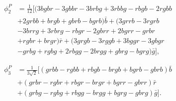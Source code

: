 \documentclass[prd,twocolumn,floatfix,nofootinbib]{revtex4}
\begin{document}
\begin{equation}
    \begin{aligned}
        \phi_{2}^{P} &=\frac{1}{12}\Big[(3bgbr-3gbbr-3brbg+3rbbg-rbgb-2rgbb \nonumber\\
        &+2grbb+brgb+gbrb-bgrb)\bar{b}+(3grrb-3rgrb \nonumber\\
        &-3brrg+3rbrg-rbgr-2gbrr+2bgrr-grbr  \nonumber \\
        &+rgbr+brgr)\bar{r}+(3grgb-3rggb+3bggr-3gbgr\nonumber \\
        &-grbg+rgbg+2rbgg-2brgg+gbrg-bgrg)\bar{g}\Big],    
    \end{aligned}
\end{equation}
    
\begin{equation}
    \begin{aligned}
        \phi_{3}^{P} &=\frac{1}{3\sqrt{2}}\Big[(grbb-rgbb+rbgb-brgb+bgrb-gbrb)\bar{b}\nonumber\\
        &+(grbr-rgbr+rbgr-brgr+bgrr-gbrr)\bar{r}\nonumber \\
        &+(grbg-rgbg+rbgg-brgg+bgrg-gbrg)\bar{g}\Big].    
    \end{aligned}
\end{equation}
\end{document}
